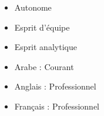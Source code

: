 \twocolumnsection
{
    \vspace{1em}
    \begin{itemize}
    	\item Autonome
    	\item Esprit d'équipe
        \item Esprit analytique
    \end{itemize}}
{
\vspace{1em}
\begin{itemize}
    \item Arabe : Courant
    \item Anglais : Professionnel
    \item Français : Professionnel
\end{itemize}}
